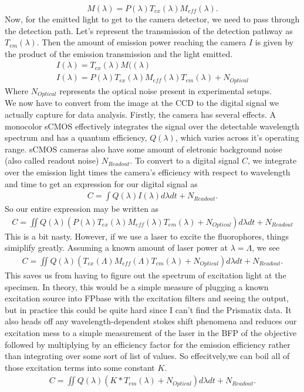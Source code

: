 \begin{equation}
	M(\lambda)  =P(\lambda) T_{ex}(\lambda) M_{eff}(\lambda).
\end{equation}
Now, for the emitted light to get to the camera detector, we need to pass through the detection path. Let's represent the transmission of the detection pathway as $T_{em}(\lambda)$. Then the amount of emission power reaching the camera $I$ is given by the product of the emission transmission and the light emitted.
\begin{gather}
	I(\lambda) = T_{ex}(\lambda) M((\lambda)\\
	I(\lambda)= P(\lambda) T_{ex}(\lambda) M_{eff}(\lambda) T_{em}(\lambda)+N_{Optical}
\end{gather}
Where $N_{Optical}$ represents the optical noise present in experimental setups. \\

We now have to convert from the image at the CCD to the digital signal we actually capture for data analysis. Firstly, the camera has several effects. A monocolor sCMOS effectively integrates the signal over the detectable wavelength spectrum and has a quantum efficiency, $Q(\lambda)$, which varies across it's operating range. sCMOS cameras also have some amount of eletronic background noise (also called readout noise) $N_{Readout}$. To convert to a digital signal $C$, we integrate over the emission light times the camera's efficiency with respect to wavelength and time to get an expression for our digital signal as
\begin{gather}
	C = \int Q(\lambda)I(\lambda) d\lambda dt + N_{Readout}.
\end{gather}
So our entire expression may be written as 
\begin{gather}
   C = \iint Q(\lambda) \left(P(\lambda) T_{ex}(\lambda) M_{eff}(\lambda) T_{em}(\lambda)+N_{Optical}\right) d\lambda dt + N_{Readout}
\end{gather}
This is a bit nasty. However, if we use a laser to excite the fluorophores, things simiplify greatly. Assuming a known amount of laser power at $\lambda = \Lambda$, we see
\begin{gather}
            C=  \iint Q(\lambda) \left( T_{ex}(\Lambda) M_{eff}(\Lambda) T_{em}(\lambda)+N_{Optical}\right) d\lambda dt + N_{Readout}.
\end{gather}
This saves us from having to figure out the spectrum of excitation light at the specimen. In theory, this would be a simple measure of plugging a known excitation source into FPbase with the excitation filters and seeing the output, but in practice this could be quite hard since I can't find the Prismatix data. It also heads off any wavelength-dependent stokes shift phenomena and reduces our excitation mess to a simple measurement of the laser in the BFP of the objective followed by multiplying by an efficiency factor for the emission efficiency rather than integrating over some sort of list of values. So effecitvely,we can boil all of those excitation terms into some constant $K$.
\begin{gather}
            C=  \iint Q(\lambda) \left(K * T_{em}(\lambda)+N_{Optical}\right) d\lambda dt + N_{Readout}.
\end{gather}

